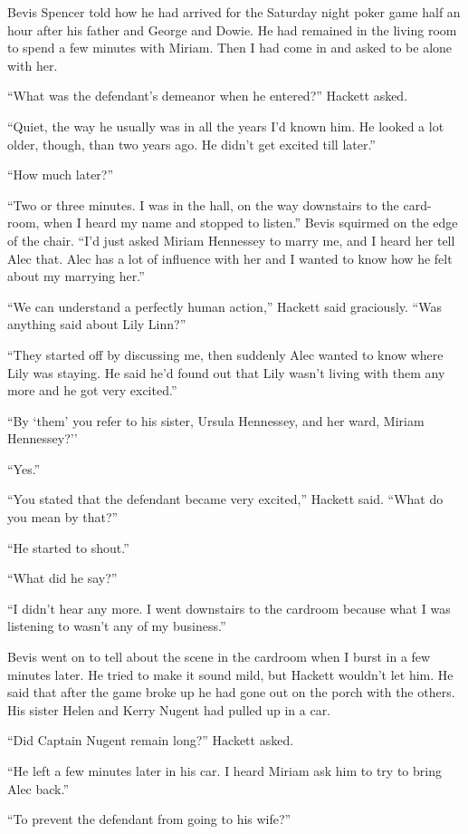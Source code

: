 {Bevis Spencer told how he had arrived for the Saturday night poker game half an hour after his father and George and Dowie. He had remained in the living room to spend a few minutes with Miriam. Then I had come in and asked to be alone with her.

“What was the defendant’s demeanor when he entered?” Hackett asked.

“Quiet, the way he usually was in all the years I’d known him. He looked a lot older, though, than two years ago. He didn’t get excited till later.”

“How much later?”

“Two or three minutes. I was in the hall, on the way downstairs to the card-room, when I heard my name and stopped to listen.” Bevis squirmed on the edge of the chair. “I’d just asked Miriam Hennessey to marry me, and I heard her tell Alec that. Alec has a lot of influence with her and I wanted to know how he felt about my marrying her.”

“We can understand a perfectly human action,” Hackett said graciously. “Was anything said about Lily Linn?”

“They started off by discussing me, then suddenly Alec wanted to know where Lily was staying. He said he’d found out that Lily wasn’t living with them any more and he got very excited.”

“By ‘them’ you refer to his sister, Ursula Hennessey, and her ward, Miriam Hennessey?’’

“Yes.”

“You stated that the defendant became very excited,” Hackett said. “What do you mean by that?”

“He started to shout.”

“What did he say?”

“I didn’t hear any more. I went downstairs to the cardroom because what I was listening to wasn’t any of my business.”

Bevis went on to tell about the scene in the cardroom when I burst in a few minutes later. He tried to make it sound mild, but Hackett wouldn’t let him. He said that after the game broke up he had gone out on the porch with the others. His sister Helen and Kerry Nugent had pulled up in a car.

“Did Captain Nugent remain long?” Hackett asked.

“He left a few minutes later in his car. I heard Miriam ask him to try to bring Alec back.”

“To prevent the defendant from going to his wife?”

}
